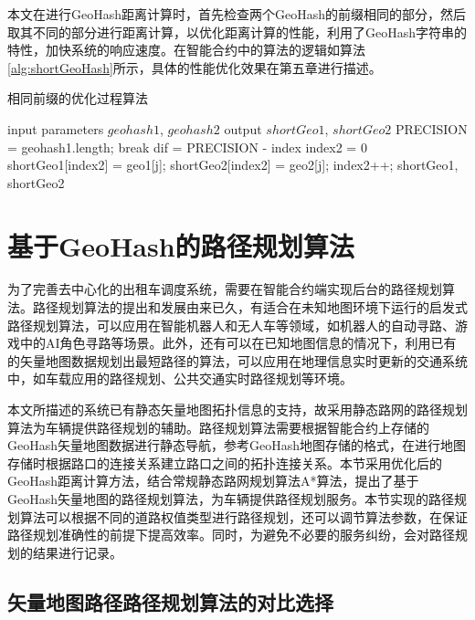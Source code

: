 本文在进行GeoHash距离计算时，首先检查两个GeoHash的前缀相同的部分，然后取其不同的部分进行距离计算，以优化距离计算的性能，利用了GeoHash字符串的特性，加快系统的响应速度。在智能合约中的算法的逻辑如算法\ref{alg:shortGeoHash}所示，具体的性能优化效果在第五章进行描述。

\begin{algorithm}[t]
  \caption{相同前缀的优化过程算法}
  \label{alg:shortGeoHash}
  \begin{algorithmic}[1]
  \REQUIRE input parameters $geohash1$, $geohash2$
  \ENSURE output $shortGeo1$, $shortGeo2$
  \STATE PRECISION = geohash1.length;
      \STATE break
    \ENDIF
  \ENDFOR
  \STATE dif = PRECISION - index
  \STATE index2 = 0
    \STATE shortGeo1[index2] = geo1[j];
    \STATE shortGeo2[index2] = geo2[j];
    \STATE index2++;
  \ENDFOR
  \RETURN shortGeo1, shortGeo2
  \end{algorithmic}
\end{algorithm}

\section{基于GeoHash的路径规划算法}
为了完善去中心化的出租车调度系统，需要在智能合约端实现后台的路径规划算法。路径规划算法的提出和发展由来已久，有适合在未知地图环境下运行的启发式路径规划算法，可以应用在智能机器人和无人车等领域，如机器人的自动寻路、游戏中的AI角色寻路等场景。此外，还有可以在已知地图信息的情况下，利用已有的矢量地图数据规划出最短路径的算法，可以应用在地理信息实时更新的交通系统中，如车载应用的路径规划、公共交通实时路径规划等环境。

本文所描述的系统已有静态矢量地图拓扑信息的支持，故采用静态路网的路径规划算法为车辆提供路径规划的辅助。路径规划算法需要根据智能合约上存储的GeoHash矢量地图数据进行静态导航，参考GeoHash地图存储的格式，在进行地图存储时根据路口的连接关系建立路口之间的拓扑连接关系。本节采用优化后的GeoHash距离计算方法，结合常规静态路网规划算法A*算法，提出了基于GeoHash矢量地图的路径规划算法，为车辆提供路径规划服务。本节实现的路径规划算法可以根据不同的道路权值类型进行路径规划，还可以调节算法参数，在保证路径规划准确性的前提下提高效率。同时，为避免不必要的服务纠纷，会对路径规划的结果进行记录。

\subsection{矢量地图路径路径规划算法的对比选择}

